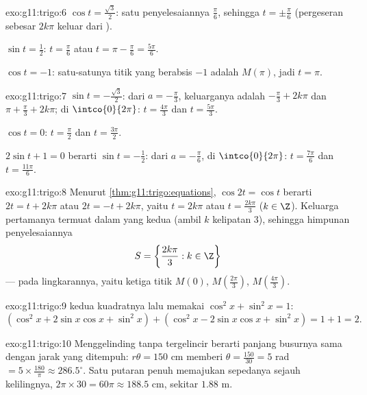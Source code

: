 \begin{solution}{exo:g11:trigo:6}
$\cos t = \frac{\sqrt3}{2}$: satu penyelesaiannya $\frac\pi6$, sehingga
$t = \pm\frac\pi6$ (pergeseran sebesar $2k\pi$ keluar dari ).

$\sin t = \frac12$: $t = \frac\pi6$ atau $t = \pi - \frac\pi6 =
\frac{5\pi}{6}$.

$\cos t = -1$: satu-satunya titik yang berabsis $-1$ adalah $M(\pi)$, jadi $t = \pi$.
\end{solution}

\begin{solution}{exo:g11:trigo:7}
$\sin t = -\frac{\sqrt3}{2}$: dari $a = -\frac\pi3$, keluarganya adalah
$-\frac\pi3 + 2k\pi$ dan $\pi + \frac\pi3 + 2k\pi$; di
$\intco{0}{2\pi}$: $t = \frac{4\pi}{3}$ dan $t = \frac{5\pi}{3}$.

$\cos t = 0$: $t = \frac\pi2$ dan $t = \frac{3\pi}{2}$.

$2\sin t + 1 = 0$ berarti $\sin t = -\frac12$: dari $a = -\frac\pi6$, di
$\intco{0}{2\pi}$: $t = \frac{7\pi}{6}$ dan $t = \frac{11\pi}{6}$.
\end{solution}

\begin{solution}{exo:g11:trigo:8}
Menurut \cref{thm:g11:trigo:equations}, $\cos 2t = \cos t$ berarti
$2t = t + 2k\pi$ atau $2t = -t + 2k\pi$, yaitu $t = 2k\pi$ atau
$t = \frac{2k\pi}{3}$ ($k \in \Z$). Keluarga pertamanya termuat dalam
yang kedua (ambil $k$ kelipatan $3$), sehingga himpunan penyelesaiannya
\[
S = \left\{\frac{2k\pi}{3} : k \in \Z\right\}
\]
--- pada lingkarannya, yaitu ketiga titik $M(0)$,
$M\!\left(\frac{2\pi}{3}\right)$, $M\!\left(\frac{4\pi}{3}\right)$.
\end{solution}

\begin{solution}{exo:g11:trigo:9}
 kedua kuadratnya lalu memakai $\cos^2 x + \sin^2 x = 1$:
\[
(\cos^2 x + 2\sin x\cos x + \sin^2 x)
+ (\cos^2 x - 2\sin x\cos x + \sin^2 x)
= 1 + 1 = 2 .
\]
\end{solution}

\begin{solution}{exo:g11:trigo:10}
Menggelinding tanpa tergelincir berarti panjang busurnya sama dengan jarak
yang ditempuh: $r\theta = 150$ cm memberi
$\theta = \frac{150}{30} = 5$ rad $= 5 \times \frac{180}{\pi} \approx
286.5^\circ$. Satu putaran penuh memajukan sepedanya sejauh kelilingnya,
$2\pi \times 30 = 60\pi \approx 188.5$ cm, sekitar $1.88$ m.
\end{solution}

